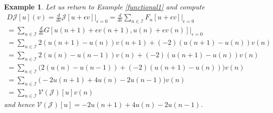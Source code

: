 \documentclass[sigconf,twocolumn]{acmart}
\newcommand{\1}{{\chi}}
\numberwithin{equation}{section}
\theoremstyle{thmlemcorr}
\numberwithin{theorem}{section}
\theoremstyle{thmlemcorr*}
\theoremstyle{defi}
\theoremstyle{remexample}
\newtheorem{example}[theorem]{Example}
\theoremstyle{ass}
\begin{document}
\begin{example}
	Let us return to Example \ref{functional1} and compute
	\begin{gather*}
		D\mathcal{J}[u](v)=\frac{d}{d\epsilon}\mathcal{J}[u+\epsilon v]\bigg|_{\epsilon=0}=\frac{d}{d\epsilon}\sum_{n\in{\mathcal{I}}}F_n[u+\epsilon v]\bigg|_{\epsilon=0}\\
		=\sum_{n\in{\mathcal{I}}}\frac{d}{d\epsilon}G[u(n+1)+\epsilon v(n+1),u(n)+\epsilon v(n)]\bigg|_{\epsilon=0}\\
		=\sum_{n\in{\mathcal{I}}}2(u(n+1)-u(n))v(n+1)+(-2)(u(n+1)-u(n))v(n)\\
		=\sum_{n\in{\mathcal{I}}}2(u(n)-u(n-1))v(n)+(-2)(u(n+1)-u(n))v(n)\\
		=\sum_{n\in{\mathcal{I}}}\Big(2(u(n)-u(n-1))+(-2)(u(n+1)-u(n))\Big)v(n)\\
		=\sum_{n\in{\mathcal{I}}}\Big(-2u(n+1)+4u(n)-2u(n-1)\Big)v(n)\\
		=\sum_{n\in{\mathcal{I}}}\mathcal{V}(\mathcal{J})[u]v(n)
	\end{gather*}
	and hence \(\mathcal{V}(\mathcal{J})[u]=-2u(n+1)+4u(n)-2u(n-1)\).
\end{example}
\end{document}
